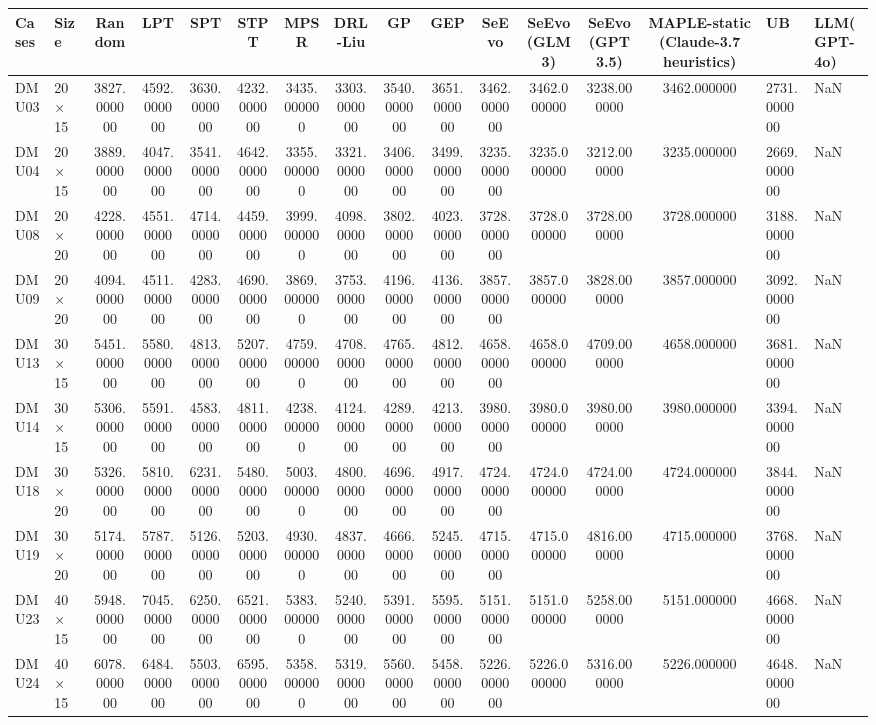 \begin{tabular}{llcccccccccccc}
\toprule
Cases & Size & Random & LPT & SPT & STPT & MPSR & DRL-Liu & GP & GEP & SeEvo & SeEvo(GLM3) & SeEvo(GPT3.5) & MAPLE-static (Claude-3.7 heuristics) & UB & LLM(GPT-4o) \\
\midrule
DMU03 & 20 × 15 & 3827.000000 & 4592.000000 & 3630.000000 & 4232.000000 & 3435.000000 & 3303.000000 & 3540.000000 & 3651.000000 & 3462.000000 & 3462.000000 & 3238.000000 & 3462.000000 & 2731.000000 & NaN \\
DMU04 & 20 × 15 & 3889.000000 & 4047.000000 & 3541.000000 & 4642.000000 & 3355.000000 & 3321.000000 & 3406.000000 & 3499.000000 & 3235.000000 & 3235.000000 & 3212.000000 & 3235.000000 & 2669.000000 & NaN \\
DMU08 & 20 × 20 & 4228.000000 & 4551.000000 & 4714.000000 & 4459.000000 & 3999.000000 & 4098.000000 & 3802.000000 & 4023.000000 & 3728.000000 & 3728.000000 & 3728.000000 & 3728.000000 & 3188.000000 & NaN \\
DMU09 & 20 × 20 & 4094.000000 & 4511.000000 & 4283.000000 & 4690.000000 & 3869.000000 & 3753.000000 & 4196.000000 & 4136.000000 & 3857.000000 & 3857.000000 & 3828.000000 & 3857.000000 & 3092.000000 & NaN \\
DMU13 & 30 × 15 & 5451.000000 & 5580.000000 & 4813.000000 & 5207.000000 & 4759.000000 & 4708.000000 & 4765.000000 & 4812.000000 & 4658.000000 & 4658.000000 & 4709.000000 & 4658.000000 & 3681.000000 & NaN \\
DMU14 & 30 × 15 & 5306.000000 & 5591.000000 & 4583.000000 & 4811.000000 & 4238.000000 & 4124.000000 & 4289.000000 & 4213.000000 & 3980.000000 & 3980.000000 & 3980.000000 & 3980.000000 & 3394.000000 & NaN \\
DMU18 & 30 × 20 & 5326.000000 & 5810.000000 & 6231.000000 & 5480.000000 & 5003.000000 & 4800.000000 & 4696.000000 & 4917.000000 & 4724.000000 & 4724.000000 & 4724.000000 & 4724.000000 & 3844.000000 & NaN \\
DMU19 & 30 × 20 & 5174.000000 & 5787.000000 & 5126.000000 & 5203.000000 & 4930.000000 & 4837.000000 & 4666.000000 & 5245.000000 & 4715.000000 & 4715.000000 & 4816.000000 & 4715.000000 & 3768.000000 & NaN \\
DMU23 & 40 × 15 & 5948.000000 & 7045.000000 & 6250.000000 & 6521.000000 & 5383.000000 & 5240.000000 & 5391.000000 & 5595.000000 & 5151.000000 & 5151.000000 & 5258.000000 & 5151.000000 & 4668.000000 & NaN \\
DMU24 & 40 × 15 & 6078.000000 & 6484.000000 & 5503.000000 & 6595.000000 & 5358.000000 & 5319.000000 & 5560.000000 & 5458.000000 & 5226.000000 & 5226.000000 & 5316.000000 & 5226.000000 & 4648.000000 & NaN \\

\end{tabular}
